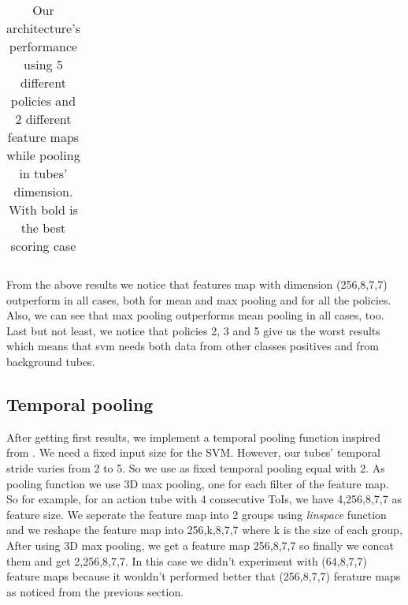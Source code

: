 \begin{center}
\begin{longtable}{||c | c | c| c||c c c||}
  \caption{Our architecture's performance using 5 different policies and 2 different feature maps while pooling in
  tubes' dimension. With bold is the best scoring case}
  \label{table:svm_first_results}
\end{longtable} 
\end{center}

From the above results we notice that features map with dimension (256,8,7,7) outperform in all cases, both for mean and max pooling and
for all the policies. Also, we can see that max pooling outperforms mean pooling in all cases, too. Last but not least, we notice that policies
2, 3 and 5 give us the worst results which means that svm needs both data from other classes positives and from background tubes. 

\subsection{Temporal pooling}
After getting first results, we implement a temporal pooling function inspired from \cite{DBLP:journals/corr/HouCS17}. We need a
fixed input size for the SVM. However, our tubes' temporal stride varies from 2 to 5. So we use as fixed temporal pooling equal
with 2. As pooling function we use 3D max pooling, one for each filter of the feature map.  So for example, for an action tube
with 4 consecutive ToIs, we  have 4,256,8,7,7 as feature size. We seperate the feature map into 2 groups using \textit{linspace}
function and we reshape the feature map into 256,k,8,7,7 where k is the size of each group, After using 3D max pooling, we get
a feature map 256,8,7,7 so finally we concat them and get 2,256,8,7,7. In this case we didn't experiment with (64,8,7,7) feature
maps because it wouldn't performed better that (256,8,7,7) ferature maps as noticed from the previous section.

